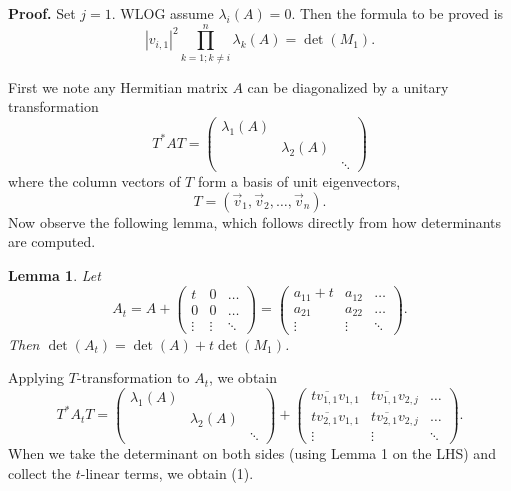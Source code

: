 \documentclass[12pt, letterpaper]{article}
\newtheorem{lemma}{Lemma}
\begin{document}
\textbf{Proof.} Set $j = 1$. WLOG assume $\lambda_i(A) = 0$. Then the formula to be proved is
\begin{equation}
    |v_{i,1}|^2 \prod_{k = 1; k \neq i}^n \lambda_k(A)
    = \det(M_1). 
\end{equation}

First we note any Hermitian matrix $A$ can be diagonalized by a unitary transformation
\[
    T^*AT = 
    \begin{pmatrix}
        \lambda_1(A) & & \\
        & \lambda_2(A) & \\
        & & \ddots
    \end{pmatrix}
\]
where the column vectors of $T$ form a basis of unit eigenvectors,
\[
    T = (\vec{v}_1, \vec{v}_2, \dots, \vec{v}_n).
\]
Now observe the following lemma, which follows directly from how determinants are computed.

\begin{lemma}
Let
\[
    A_t = A +
    \begin{pmatrix}
        t  & 0    & \dots\\
        0      & 0    & \dots\\
        \vdots      & \vdots    & \ddots
    \end{pmatrix}
    =
    \begin{pmatrix}
        a_{11} + t  & a_{12}    & \dots\\
        a_{21}      & a_{22}    & \dots\\
        \vdots      & \vdots    & \ddots
    \end{pmatrix}.
\]
Then $\det(A_t) = \det(A) + t\det(M_1)$.
\end{lemma}

Applying $T$-transformation to $A_t$, we obtain
\[
    T^*A_tT =
    \begin{pmatrix}
        \lambda_1(A) & & \\
        & \lambda_2(A) & \\
        & & \ddots
    \end{pmatrix}
    +
    \begin{pmatrix}
        t\overline{v_{1,1}}v_{1,1}   & t\overline{v_{1,1}}v_{2,j} & \dots\\
        t\overline{v_{2,1}}v_{1,1}   & t\overline{v_{2,1}}v_{2,j} & \dots\\
        \vdots                  & \vdots                & \ddots
    \end{pmatrix}.
\]
When we take the determinant on both sides (using Lemma 1 on the LHS) and collect the $t$-linear terms, we obtain (1).
\end{document}

